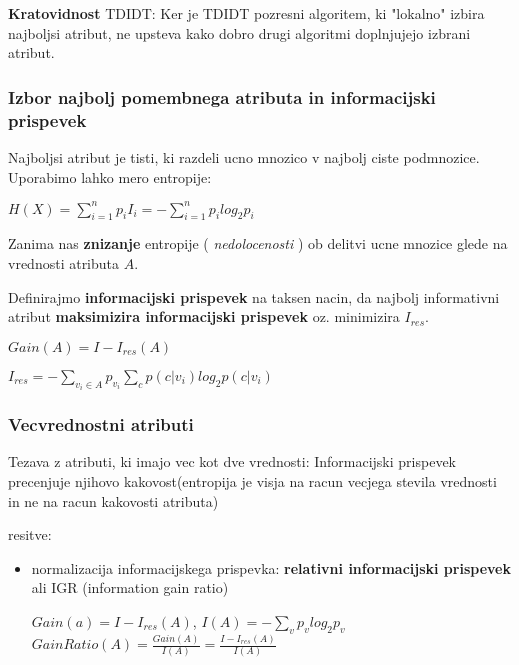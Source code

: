 \documentclass{article}
\begin{document}
\begin{multicols}{2}
\textbf{Kratovidnost} TDIDT:
Ker je TDIDT pozresni algoritem, ki "lokalno" izbira najboljsi atribut, ne upsteva kako dobro drugi algoritmi
doplnjujejo izbrani atribut.


\subsubsection{Izbor najbolj pomembnega atributa in informacijski prispevek}
Najboljsi atribut je tisti, ki razdeli ucno mnozico v najbolj ciste podmnozice.
Uporabimo lahko mero entropije:
\begin{center}
    \begin{math}
        H(X) = \sum_{i=1}^{n} p_i I_i = -\sum_{i=1}^{n} p_i log_2 p_i
    \end{math}
\end{center}

Zanima nas \textbf{znizanje} entropije ( \textit{nedolocenosti} ) ob delitvi ucne mnozice glede
na vrednosti atributa $A$. 

Definirajmo \textbf{informacijski prispevek} na taksen nacin,
da najbolj informativni atribut \textbf{maksimizira informacijski prispevek} oz. minimizira $I_{res}$.
\begin{center}
  \begin{math}
    Gain(A) = I - I_{res}(A)
  \end{math}

  \begin{math}
    I_{res} = - \sum_{v_i \in A} p_{v_i} \sum_c p(c|v_i) log_2 p(c|v_i)
  \end{math}
\end{center}

\subsubsection{Vecvrednostni atributi}
Tezava z atributi, ki imajo vec kot dve vrednosti: Informacijski prispevek precenjuje
njihovo kakovost(entropija je visja na racun vecjega stevila vrednosti in ne na racun kakovosti atributa)

resitve:
\begin{itemize}
  \item normalizacija informacijskega prispevka: \textbf{relativni informacijski prispevek} ali IGR (information gain ratio)
    \begin{center}
      \begin{math}
        Gain(a) = I - I_{res}(A)
      \end{math},
      \begin{math}
        I(A) = - \sum_v p_v log_2 p_v
      \end{math}
      \begin{math}
        GainRatio(A) = \frac{Gain(A)}{I(A)} = \frac{I - I_{res}(A)}{I(A)}
      \end{math}
    \end{center}
  

\end{itemize}
\end{multicols}
\end{document}
